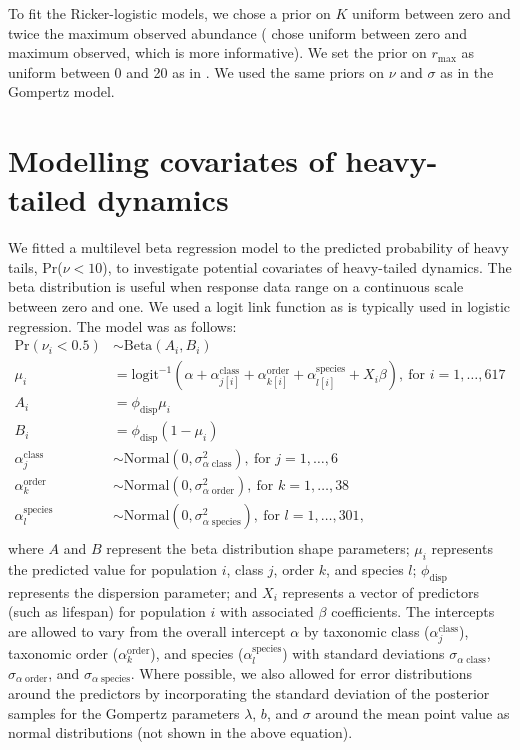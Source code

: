 To fit the Ricker-logistic models, we chose a prior on $K$ uniform between zero
and twice the maximum observed abundance (\citet{clark2010} chose uniform
between zero and maximum observed, which is more informative). We set the prior
on $r_\mathrm{max}$ as uniform between 0 and 20 as in \citet{clark2010}. We used
the same priors on $\nu$ and $\sigma$ as in the Gompertz model.

\section{Modelling covariates of heavy-tailed dynamics}

We fitted a multilevel beta regression model to the predicted probability of
heavy tails, Pr($\nu < 10$), to investigate potential covariates of heavy-tailed
dynamics. The beta distribution is useful when response data range on
a continuous scale between zero and one. We used a logit link function as is
typically used in logistic regression. The model was as follows:
\begin{align*}
\mathrm{Pr}(\nu_i < 0.5) &\sim \mathrm{Beta}(A_i, B_i)\\
\mu_i &= \mathrm{logit}^{-1}(\alpha
  + \alpha^\mathrm{class}_{j[i]}
  + \alpha^\mathrm{order}_{k[i]}
  + \alpha^\mathrm{species}_{l[i]}
  + X_i \beta),
  \: \text{for } i = 1, \dots, 617\\
A_i &= \phi_\mathrm{disp} \mu_i\\
B_i &= \phi_\mathrm{disp} (1 - \mu_i)\\
\alpha^\mathrm{class}_j &\sim
  \mathrm{Normal}(0, \sigma^2_{\alpha \; \mathrm{class}}),
  \: \text{for } j = 1, \dots, 6\\
\alpha^\mathrm{order}_k &\sim
  \mathrm{Normal}(0, \sigma^2_{\alpha \; \mathrm{order}}),
  \: \text{for } k = 1, \dots, 38\\
\alpha^\mathrm{species}_l &\sim
  \mathrm{Normal}(0, \sigma^2_{\alpha \; \mathrm{species}}),
  \: \text{for } l = 1, \dots, 301,\\
\end{align*}
where $A$ and $B$ represent the beta distribution shape parameters; $\mu_i$
represents the predicted value for population $i$, class $j$, order $k$, and
species $l$; $\phi_\mathrm{disp}$ represents the dispersion parameter; and $X_i$
represents a vector of predictors (such as lifespan) for population $i$ with
associated $\beta$ coefficients. The intercepts are allowed to vary from the
overall intercept $\alpha$ by taxonomic class ($\alpha^\mathrm{class}_j$),
taxonomic order ($\alpha^\mathrm{order}_k$), and species
($\alpha^\mathrm{species}_l$) with standard deviations $\sigma_{\alpha \;
  \mathrm{class}}$, $\sigma_{\alpha \; \mathrm{order}}$, and $\sigma_{\alpha \;
  \mathrm{species}}$. Where possible, we also allowed for error distributions
around the predictors by incorporating the standard deviation of the posterior
samples for the Gompertz parameters $\lambda$, $b$, and $\sigma$ around the
mean point value as normal distributions (not shown in the above equation).

